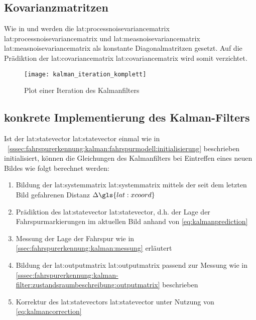 \subsection{Kovarianzmatritzen}
Wie in \autocite{petersfalkoFPGAbasierteBildverarbeitungspipelineZur2009} und \autocite{risackRobustLaneRecognition} werden die \glsdesc{lat:processnoisevariancematrix} \gls{lat:processnoisevariancematrix} und \glsdesc{lat:measnoisevariancematrix} \gls{lat:measnoisevariancematrix} als konstante Diagonalmatritzen gesetzt. Auf die Prädiktion der \glsdesc{lat:covariancematrix} \gls{lat:covariancematrix} wird somit verzichtet.

\begin{figure}[htb]
  \centering
  \texttt{[image: kalman\_iteration\_komplett]}
  \caption{Plot einer Iteration des Kalmanfilters}
  \label{fig:kalman:iteration_komplett}
\end{figure}

\subsection{konkrete Implementierung des Kalman-Filters}
Ist der \glsdesc{lat:statevector} \gls{lat:statevector} einmal wie in ~\ref{sssec:fahrspurerkennung:kalman:fahrspurmodell:initialisierung} beschrieben initialisiert, können die Gleichungen des Kalmanfilters bei Eintreffen eines neuen Bildes wie folgt berechnet werden:
\begin{enumerate}
\item Bildung der \glsdesc{lat:systemmatrix} \gls{lat:systemmatrix} mittels der seit dem letzten Bild gefahrenen Distanz \begin{math} \Delta \gls{lat:xcoord} \end{math}
\item Prädiktion des \glsdesc{lat:statevector} \gls{lat:statevector}, d.h. der Lage der Fahrspurmarkierungen im aktuellen Bild anhand von \eqref{eq:kalmanprediction}
\item Messung der Lage der Fahrspur wie in \ref{ssec:fahrspurerkennung:kalman:messung}
erläutert
\item Bildung der \glsdesc{lat:outputmatrix} \gls{lat:outputmatrix} passend zur Messung wie in \ref{sssec:fahrspurerkennung:kalman-filter:zustandsraumbeschreibung:outputmatrix} beschrieben
\item Korrektur des \glsdesc{lat:statevector}s \gls{lat:statevector} unter Nutzung von \eqref{eq:kalmancorrection}
\end{enumerate}




